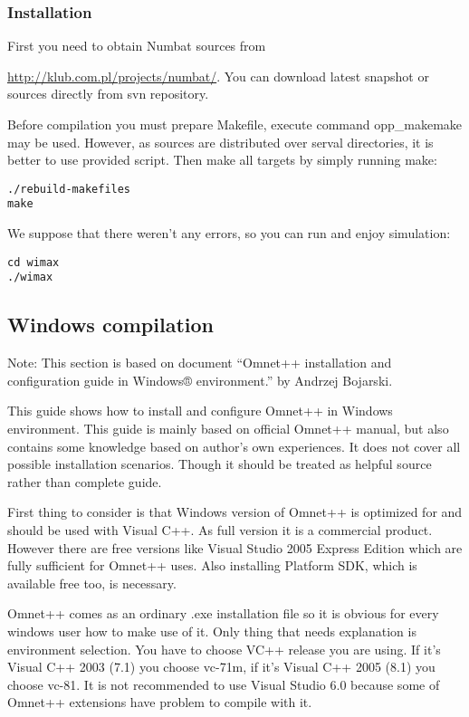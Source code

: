\subsubsection{Installation}
First you need to obtain Numbat sources from
{\href{http://klub.com.pl/projects/numbat/}{http://klub.com.pl/projects/numbat/}. You
  can download latest snapshot or sources directly from svn
  repository.

Before compilation you must prepare Makefile, execute command
opp\_makemake may be used. However, as sources are distributed over
serval directories, it is better to use provided script. Then make all
targets by simply running make:
\begin{lstlisting}
./rebuild-makefiles
make
\end{lstlisting}

We suppose that there weren't any errors, so you can run and enjoy simulation:
\begin{lstlisting}
cd wimax
./wimax
\end{lstlisting}

\subsection{Windows compilation}
Note: This section is based on document ``Omnet++ installation and
configuration guide in Windows® environment.'' by Andrzej Bojarski.

This guide shows how to install and configure Omnet++ in Windows
environment. This guide is mainly based on official Omnet++ manual,
but also contains some knowledge based on author's own experiences. It
does not cover all possible installation scenarios. Though it should
be treated as helpful source rather than complete guide.

First thing to consider is that Windows version of Omnet++ is
optimized for and should be used with Visual C++. As full version it
is a commercial product. However there are free versions like Visual
Studio 2005 Express Edition which are fully sufficient for Omnet++
uses. Also installing Platform SDK, which is available free too, is
necessary.

Omnet++ comes as an ordinary .exe installation file so it is obvious
for every windows user how to make use of it. Only thing that needs
explanation is environment selection. You have to choose VC++ release
you are using. If it's Visual C++ 2003 (7.1) you choose vc-71m, if
it's Visual C++ 2005 (8.1) you choose vc-81. It is not recommended to
use Visual Studio 6.0 because some of Omnet++ extensions have problem
to compile with it.

}
